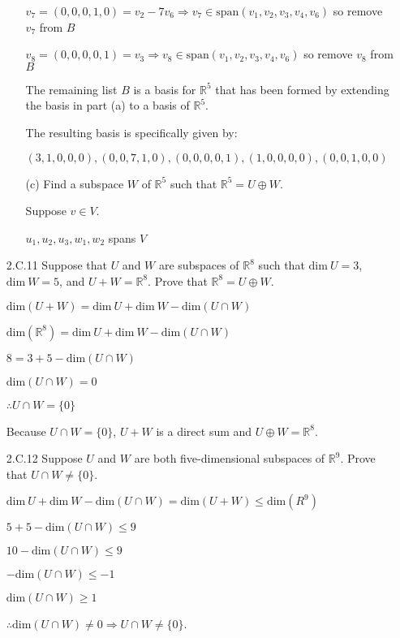 \documentclass[fleqn]{article}
\begin{document}
\begin{enumerate}[nolistsep]
\begin{enumerate}[nolistsep]
				$v_7 = (0, 0, 0, 1, 0) = v_2 - 7v_6 \Rightarrow v_7 \in \text{span}(v_1, v_2, v_3, v_4, v_6)$ so remove $v_7$ from $B$
				
				$v_8 = (0, 0, 0, 0, 1) = v_3 \Rightarrow v_8 \in \text{span}(v_1, v_2, v_3, v_4, v_6)$ so remove $v_8$ from $B$
				 
				 The remaining list $B$ is a basis for $\mathbb{R}^5$ that has been formed by extending the basis in part (a) to a basis of $\mathbb{R}^5$.
				 
				The resulting basis is specifically given by:
				
				$(3, 1, 0, 0, 0), (0, 0, 7, 1, 0), (0, 0, 0, 0, 1), (1, 0, 0, 0, 0), (0, 0, 1, 0, 0)$
					
				\item[(c)] Find a subspace $W$ of $\mathbb{R}^5$ such that $\mathbb{R}^5 = U \oplus W$.
				
				Suppose $v \in V$. 
				
				$u_1, u_2, u_3, w_1, w_2$ spans $V$   		
			\end{enumerate}
			
		\item[2.C.11] Suppose that $U$ and $W$ are subspaces of $\mathbb{R}^8$ such that $\text{dim}\ U = 3$, $\text{dim}\ W = 5$, and $U + W = \mathbb{R}^8$. Prove that $\mathbb{R}^8 = U \oplus W$.
		
		$\text{dim}(U + W) = \text{dim}\ U + \text{dim}\ W - \text{dim}(U \cap W)$
		
		$\text{dim}(\mathbb{R}^8) = \text{dim}\ U + \text{dim}\ W - \text{dim}(U \cap W)$
		
		$8 = 3 + 5 - \text{dim}(U \cap W)$
		
		$\text{dim}(U \cap W) = 0$
		
		$\therefore U \cap W = \{0\}$
		
		Because $U \cap W = \{0\}$, $U + W$ is a direct sum and $U \oplus W = \mathbb{R}^8$.
		
		\item[2.C.12] Suppose $U$ and $W$ are both five-dimensional subspaces of $\mathbb{R}^9$. Prove that $U \cap W \neq \{0\}$.
		
		$\text{dim}\ U + \text{dim}\ W - \text{dim}(U \cap W) = \text{dim}(U + W) \leq \text{dim}(R^9)$
		
		$5 + 5 - \text{dim}(U \cap W) \leq 9$
		
		$10 - \text{dim}(U \cap W) \leq 9$
		
		$-\text{dim}(U \cap W) \leq -1$
		
		$\text{dim}(U \cap W) \geq 1$
		
		$\therefore \text{dim}(U \cap W) \neq 0 \Rightarrow U \cap W \neq \{0\}$.
	\end{enumerate}
	
\end{document}
